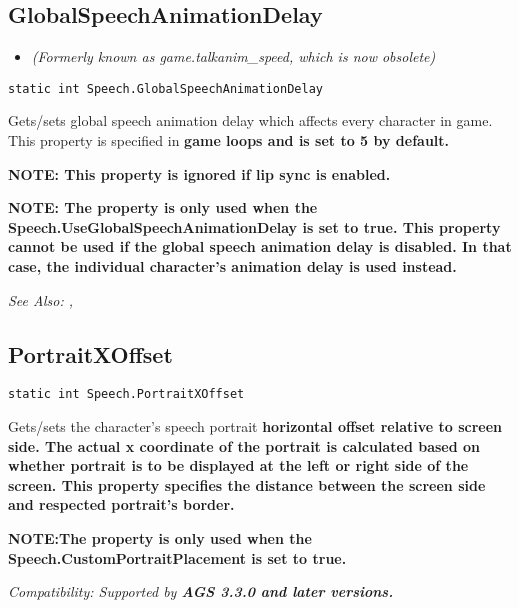 \subsection{GlobalSpeechAnimationDelay}\label{Speech.GlobalSpeechAnimationDelay}%

\begin{itemize}
\item \it{(Formerly known as game.talkanim_speed, which is now obsolete)}
\end{itemize}

\begin{verbatim}
static int Speech.GlobalSpeechAnimationDelay
\end{verbatim}

Gets/sets global speech animation delay which affects every character in game.
This property is specified in \bf{game loops} and is set to 5 by default.

\bf{NOTE:} This property is ignored if lip sync is enabled.

\bf{NOTE:} The property is only used when the \bf{Speech.UseGlobalSpeechAnimationDelay}
is set to \bf{true}. This property \bf{cannot} be used if the global speech animation
delay is disabled. In that case, the individual character's animation delay is used instead.

\it{See Also:} ,


\subsection{PortraitXOffset}\label{Speech.PortraitXOffset}%

\begin{verbatim}
static int Speech.PortraitXOffset
\end{verbatim}

Gets/sets the character's speech portrait \bf{horizontal} offset relative to screen side.
The actual x coordinate of the portrait is calculated based on whether portrait
is to be displayed at the left or right side of the screen. This property
specifies the distance between the screen side and respected portrait's border.

\bf{NOTE:}The property is only used when the \bf{Speech.CustomPortraitPlacement} is set to \bf{true}.

\it{Compatibility:} Supported by \bf{AGS 3.3.0} and later versions.

